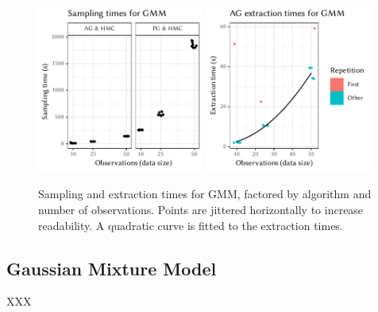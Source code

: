 \begin{figure}[t!]
  \centering
  \includegraphics[width=0.49\textwidth]{figures/GMM-sampling_times}
  \includegraphics[width=0.49\textwidth]{figures/GMM-compile_times}
  \caption{Sampling and extraction times for GMM, factored by algorithm and number of observations.
    Points are jittered horizontally to increase readability.  A quadratic curve is fitted to the
    extraction times.}
  \label{fig:plots-gmm}
\end{figure}

\subsection*{Gaussian Mixture Model}

XXX


\cleartorecto
\FloatBlock

